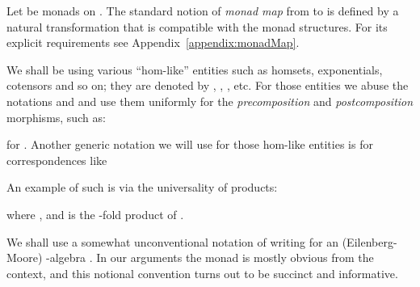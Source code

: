 \documentclass[9pt, preprint]{sigplanconf}
\theoremstyle{theorem}
\theoremstyle{definition}
\newtheorem{definition}[theorem]{Definition}
\newtheorem{remark}[theorem]{Remark}
\newif\ifignore \ignorefalse
\newcommand{\auxproof}[1]{
\ifignore\mbox{}\newline
\textbf{BEGIN: AUX-PROOF} \dotfill\newline
{#1}\mbox{}\newline
\textbf{END: AUX-PROOF}\dotfill\newline
\fi}
\begin{document}
Let  be monads on . The standard notion of
 \emph{monad map} from  to  is defined by
a natural transformation  that is compatible with
the monad structures. For its explicit requirements see
Appendix~\ref{appendix:monadMap}.




We shall be using various ``hom-like'' entities such as
homsets, exponentials, cotensors and so on; they are denoted by
, , , etc. For those entities we abuse
the notations  and  and use them uniformly for the
\emph{precomposition} and \emph{postcomposition} morphisms, such as:

for .
Another generic notation  we will use for those hom-like entities is
  for  correspondences like

An example of such is via the universality of products:

 where ,  and  is the -fold
 product of .




We shall use a somewhat unconventional notation of writing  for an
(Eilenberg-Moore) -algebra . In our arguments the
monad  is mostly obvious from the context, and this notional
convention turns out to be succinct and informative.








\auxproof{
\begin{definition}
  Let  be a binary relation.
  We then define mappings
  
  and
  
  as follows:
  

  The first operator  takes the \emph{image} of a given set
  by ; the  is the dual of  (that is probably used less
  commonly).  The operators  and  are well-known in the
  context of modal logic. They  are called \emph{diamond modality} and
  \emph{box modality}.



\end{definition}

Notice that  and  work covariantly (with respect
to ) whereas  and  work contravariantly. In fact it holds that  and .
We have two pairs of adjunctions 
and .

\begin{remark}
  If  is functional, that is, there is a function 
  such that    if and only if ,
then we have 
  and the situation degenerates to the familiar adjunction
  .
\end{remark}
}
\end{document}
